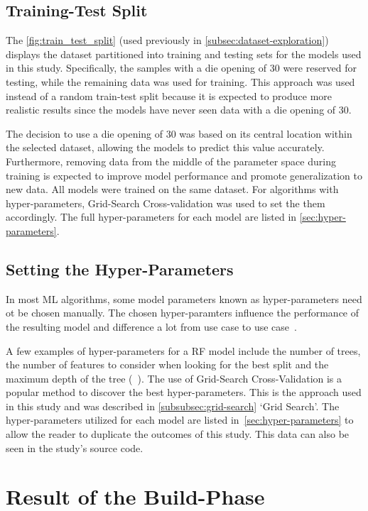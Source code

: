 \subsection{Training-Test Split}\label{subsec:training-test-split}
The \cref{fig:train_test_split} (used previously in \cref{subsec:dataset-exploration}) displays the dataset
partitioned into training and testing sets for the models used in this study.
Specifically, the samples with a die opening of 30 were reserved for testing, while the remaining data was used for
training.
This approach was used instead of a random train-test split because it is expected to produce
more realistic results since the models have never seen data with a die opening of 30.

The decision to use a die opening of 30 was based on its central location within the selected dataset, allowing the
models to predict this value accurately.
Furthermore, removing data from the middle of the parameter space during
training is expected to improve model performance and promote generalization to new data.
All models were trained on the same dataset.
For algorithms with hyper-parameters, Grid-Search Cross-validation was used to set the them accordingly.
The full hyper-parameters for each model are listed in \cref{sec:hyper-parameters}.

\subsection{Setting the Hyper-Parameters}\label{subsec:hyper-parameters}
In most \ac{ML} algorithms, some model parameters known as hyper-parameters need ot be chosen manually.
The chosen hyper-paramters influence the performance of the resulting model and difference a lot from use
case to use case~\cite[p. 1]{probst2019tunability}.

A few examples of hyper-parameters for a \ac{RF} model include the number of trees, the number
of features to consider when looking for the best split and the maximum depth of the tree
(~\cite{scikit-learn}).
The use of Grid-Search Cross-Validation is a popular method to discover the best hyper-parameters.
This is the approach used in this study and was described in \cref{subsubsec:grid-search} `Grid Search'.
The hyper-parameters utilized for each model are listed in~\cref{sec:hyper-parameters} to allow the reader to
duplicate the outcomes of this study.
This data can also be seen in the study's source code.


\section{Result of the Build-Phase}\label{sec:results-build-phase}

